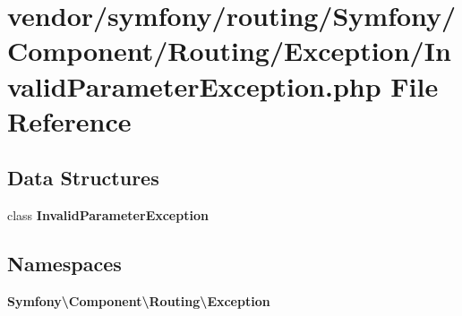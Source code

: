 \section{vendor/symfony/routing/\+Symfony/\+Component/\+Routing/\+Exception/\+Invalid\+Parameter\+Exception.php File Reference}
\label{_invalid_parameter_exception_8php}
\subsection*{Data Structures}
\begin{DoxyCompactItemize}
\item 
class {\bf Invalid\+Parameter\+Exception}
\end{DoxyCompactItemize}
\subsection*{Namespaces}
\begin{DoxyCompactItemize}
\item 
 {\bf Symfony\textbackslash{}\+Component\textbackslash{}\+Routing\textbackslash{}\+Exception}
\end{DoxyCompactItemize}
